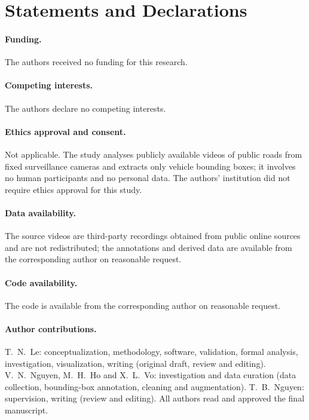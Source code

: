 \documentclass[twocolumn]{svjour3}
\begin{document}
\section*{Statements and Declarations}

\paragraph{Funding.} The authors received no funding for this research.

\paragraph{Competing interests.} The authors declare no competing interests.

\paragraph{Ethics approval and consent.} Not applicable. The study analyses
publicly available videos of public roads from fixed surveillance cameras and
extracts
only vehicle bounding boxes; it involves no human participants and no personal
data. The authors' institution did not require ethics approval for this study.

\paragraph{Data availability.} The source videos are third-party recordings
obtained from public online sources and are not redistributed; the annotations
and derived data are available from the corresponding author on reasonable
request.

\paragraph{Code availability.} The code is available from the corresponding
author on reasonable request.

\paragraph{Author contributions.} T.~N.~Le: conceptualization, methodology,
software, validation, formal analysis, investigation, visualization, writing
(original draft, review and editing). V.~N.~Nguyen, M.~H.~Ho and X.~L.~Vo:
investigation and data curation (data collection, bounding-box annotation,
cleaning and augmentation). T.~B.~Nguyen: supervision,
writing (review and editing). All authors read and approved the final
manuscript.
\end{document}
